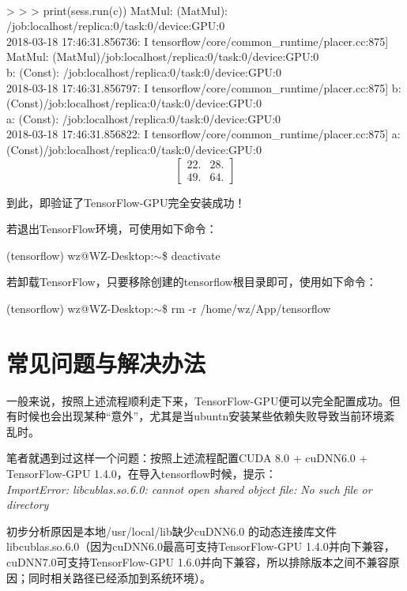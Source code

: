 \documentclass[11pt,a4paper]{ctexart}
\begin{document}
\\
> > >  print(sess.run(c))
MatMul: (MatMul): /job:localhost/replica:0/task:0/device:GPU:0\\
2018-03-18 17:46:31.856736: I tensorflow/core/common\_runtime/placer.cc:875] MatMul: (MatMul)/job:localhost/replica:0/task:0/device:GPU:0\\
b: (Const): /job:localhost/replica:0/task:0/device:GPU:0\\
2018-03-18 17:46:31.856797: I tensorflow/core/common\_runtime/placer.cc:875] b: (Const)/job:localhost/replica:0/task:0/device:GPU:0\\
a: (Const): /job:localhost/replica:0/task:0/device:GPU:0\\
2018-03-18 17:46:31.856822: I tensorflow/core/common\_runtime/placer.cc:875] a: (Const)/job:localhost/replica:0/task:0/device:GPU:0
\[\begin{bmatrix}
22. &28. \\ 
49. &64. 
\end{bmatrix}\]


到此，即验证了TensorFlow-GPU完全安装成功！

若退出TensorFlow环境，可使用如下命令：
\vspace{-0.2cm}
\begin{center}
(tensorflow) wz@WZ-Desktop:$\sim$\$ deactivate
\end{center}

若卸载TensorFlow，只要移除创建的tensorflow根目录即可，使用如下命令：
\vspace{-0.2cm}
\begin{center}
(tensorflow) wz@WZ-Desktop:$\sim$\$ rm -r /home/wz/App/tensorflow
\end{center}


\section{常见问题与解决办法}

一般来说，按照上述流程顺利走下来，TensorFlow-GPU便可以完全配置成功。但有时候也会出现某种“意外”，尤其是当ubuntn安装某些依赖失败导致当前环境紊乱时。

笔者就遇到过这样一个问题：按照上述流程配置CUDA 8.0 + cuDNN6.0 + TensorFlow-GPU 1.4.0，在导入tensorflow时候，提示：\\
{\color{red}\emph{
ImportError: libcublas.so.6.0: cannot open shared object file: No such file or directory
}}

{\heiti 初步分析原因是本地/usr/local/lib缺少cuDNN6.0 的动态连接库文件libcublas.so.6.0（因为cuDNN6.0最高可支持TensorFlow-GPU 1.4.0并向下兼容，cuDNN7.0可支持TensorFlow-GPU 1.6.0并向下兼容，所以排除版本之间不兼容原因；同时相关路径已经添加到系统环境）}。
\end{document}
